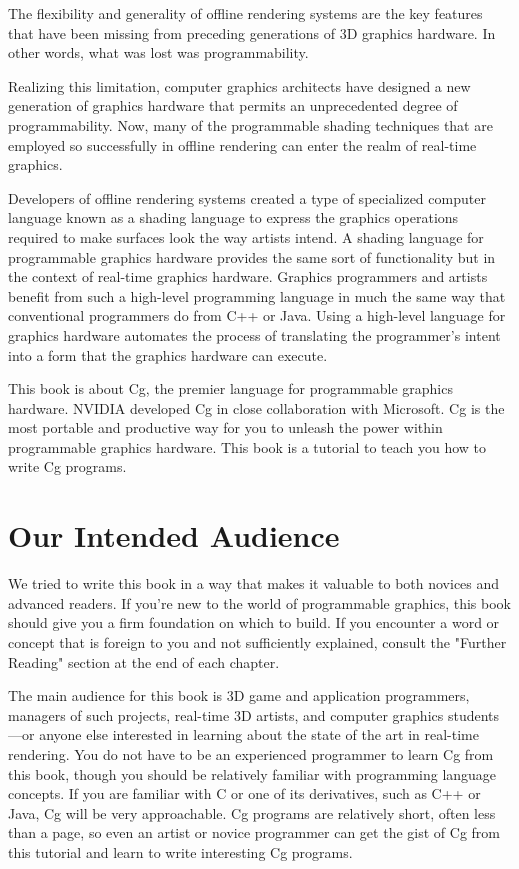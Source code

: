 \documentclass[../main.tex]{subfiles}
\begin{document}
The flexibility and generality of offline rendering systems are the key features that have been missing from preceding generations of 3D graphics hardware. In other words, what was lost was programmability.

Realizing this limitation, computer graphics architects have designed a new generation of graphics hardware that permits an unprecedented degree of programmability. Now, many of the programmable shading techniques that are employed so successfully in offline rendering can enter the realm of real-time graphics.

Developers of offline rendering systems created a type of specialized computer language known as a shading language to express the graphics operations required to make surfaces look the way artists intend. A shading language for programmable graphics hardware provides the same sort of functionality but in the context of real-time graphics hardware. Graphics programmers and artists benefit from such a high-level programming language in much the same way that conventional programmers do from C++ or Java. Using a high-level language for graphics hardware automates the process of translating the programmer's intent into a form that the graphics hardware can execute.

This book is about Cg, the premier language for programmable graphics hardware. NVIDIA developed Cg in close collaboration with Microsoft. Cg is the most portable and productive way for you to unleash the power within programmable graphics hardware. This book is a tutorial to teach you how to write Cg programs.

\section*{Our Intended Audience}

We tried to write this book in a way that makes it valuable to both novices and advanced readers. If you're new to the world of programmable graphics, this book should give you a firm foundation on which to build. If you encounter a word or concept that is foreign to you and not sufficiently explained, consult the "Further Reading" section at the end of each chapter.

The main audience for this book is 3D game and application programmers, managers of such projects, real-time 3D artists, and computer graphics students—or anyone else interested in learning about the state of the art in real-time rendering. You do not have to be an experienced programmer to learn Cg from this book, though you should be relatively familiar with programming language concepts. If you are familiar with C or one of its derivatives, such as C++ or Java, Cg will be very approachable. Cg programs are relatively short, often less than a page, so even an artist or novice programmer can get the gist of Cg from this tutorial and learn to write interesting Cg programs.
\end{document}
